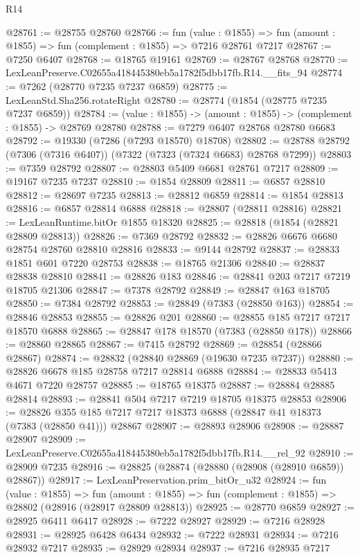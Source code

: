 \begin{lexlean}{R14}
\begin{coremodule}
@28761 := @28755 @28760
@28766 := fun (value : @1855) =>
  fun (amount : @1855) => fun (complement : @1855) => @7216 @28761 @7217
@28767 := @7250 @6407
@28768 := @18765 @19161
@28769 := @28767 @28768
@28770 := LexLeanPreserve.C02655a418445380eb5a1782f5dbb17fb.R14.__fits_94
@28774 := @7262 (@28770 @7235 @7237 @6859)
@28775 := LexLeanStd.Sha256.rotateRight
@28780 := @28774 (@1854 (@28775 @7235 @7237 @6859))
@28784 := (value : @1855) -> (amount : @1855) -> (complement : @1855) -> @28769 @28780
@28788 := @7279 @6407 @28768 @28780 @6683
@28792 := @19330 (@7286 (@7293 @18570) @18708)
@28802 := @28788 @28792 (@7306 (@7316 @6407)) (@7322 (@7323 (@7324 @6683) @28768 @7299))
@28803 := @7359 @28792
@28807 := @28803 @5409 @6681 @28761 @7217
@28809 := @19167 @7235 @7237
@28810 := @1854 @28809
@28811 := @6857 @28810
@28812 := @28697 @7235
@28813 := @28812 @6859
@28814 := @1854 @28813
@28816 := @6857 @28814 @6888
@28818 := @28807 (@28811 @28816)
@28821 := LexLeanRuntime.bitOr @1855 @18320
@28825 := @28818 (@1854 (@28821 @28809 @28813))
@28826 := @7369 @28792
@28832 := @28826 @6676 @6680 @28754 @28760 @28810 @28816
@28833 := @9144 @28792
@28837 := @28833 @1851 @601 @7220 @28753
@28838 := @18765 @21306
@28840 := @28837 @28838 @28810
@28841 := @28826 @183
@28846 := @28841 @203 @7217 @7219 @18705 @21306
@28847 := @7378 @28792
@28849 := @28847 @163 @18705
@28850 := @7384 @28792
@28853 := @28849 (@7383 (@28850 @163))
@28854 := @28846 @28853
@28855 := @28826 @201
@28860 := @28855 @185 @7217 @7217 @18570 @6888
@28865 := @28847 @178 @18570 (@7383 (@28850 @178))
@28866 := @28860 @28865
@28867 := @7415 @28792
@28869 := @28854 (@28866 @28867)
@28874 := @28832 (@28840 @28869 (@19630 @7235 @7237))
@28880 := @28826 @6678 @185 @28758 @7217 @28814 @6888
@28884 := @28833 @5413 @4671 @7220 @28757
@28885 := @18765 @18375
@28887 := @28884 @28885 @28814
@28893 := @28841 @504 @7217 @7219 @18705 @18375 @28853
@28906 := @28826 @355 @185 @7217 @7217 @18373 @6888 (@28847 @41 @18373 (@7383 (@28850 @41))) @28867
@28907 := @28893 @28906
@28908 := @28887 @28907
@28909 := LexLeanPreserve.C02655a418445380eb5a1782f5dbb17fb.R14.__rel_92
@28910 := @28909 @7235
@28916 := @28825 (@28874 (@28880 (@28908 (@28910 @6859)) @28867))
@28917 := LexLeanPreservation.prim_bitOr_u32
@28924 := fun (value : @1855) =>
  fun (amount : @1855) => fun (complement : @1855) => @28802 (@28916 (@28917 @28809 @28813))
@28925 := @28770 @6859
@28927 := @28925 @6411 @6417
@28928 := @7222 @28927
@28929 := @7216 @28928
@28931 := @28925 @6428 @6434
@28932 := @7222 @28931
@28934 := @7216 @28932 @7217
@28935 := @28929 @28934
@28937 := @7216 @28935 @7217

\end{coremodule}
\end{lexlean}
